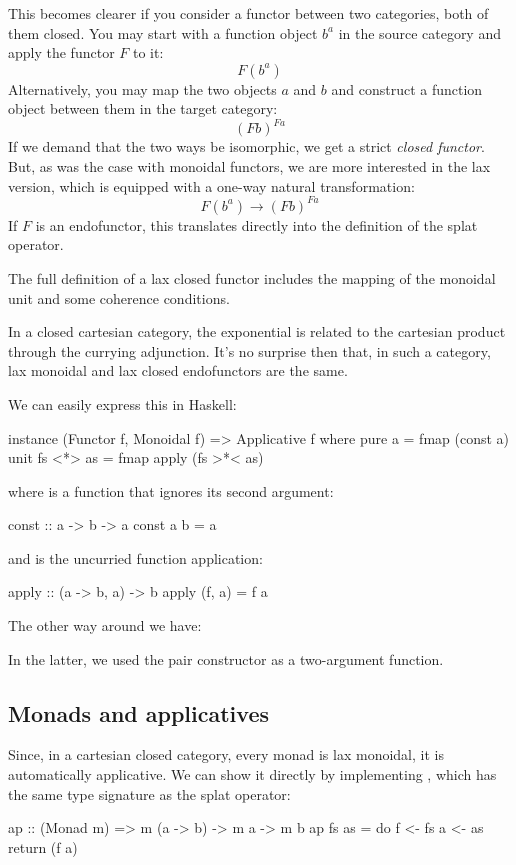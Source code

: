\documentclass[DaoFP]{subfiles}
\begin{document}
This becomes clearer if you consider a functor between two categories, both of them closed. You may start with a function object $b^a$ in the source category and apply the functor $F$ to it:
\[ F (b^a) \]
Alternatively, you may map the two objects $a$ and $b$ and construct a function object between them in the target category:
\[ (F b)^{F a} \]
If we demand that the two ways be isomorphic, we get a strict \emph{closed functor}. But, as was the case with monoidal functors, we are more interested in the lax version, which is equipped with a one-way natural transformation:
\[ F (b^a) \to (F b)^{F a} \]
If $F$ is an endofunctor, this translates directly into the definition of the splat operator. 

The full definition of a lax closed functor includes the mapping of the monoidal unit and some coherence conditions. 

In a closed cartesian category, the exponential is related to the cartesian product through the currying adjunction. It's no surprise then that, in such a category, lax monoidal and lax closed endofunctors are the same. 

We can easily express this in Haskell:
\begin{haskell}
instance (Functor f, Monoidal f) => Applicative f where
  pure a = fmap (const a) unit
  fs <*> as = fmap apply (fs >*< as)
\end{haskell}
where  is a function that ignores its second argument:
\begin{haskell}
const :: a -> b -> a
const a b = a
\end{haskell}
and  is the uncurried function application:
\begin{haskell}
apply :: (a -> b, a) -> b
apply (f, a) = f a
\end{haskell}
The other way around we have:
In the latter, we used the pair constructor \hask{(,)} as a two-argument function.

\subsection{Monads and applicatives}

Since, in a cartesian closed category, every monad is lax monoidal, it is automatically applicative. We can show it directly by implementing , which has the same type signature as the splat operator:
\begin{haskell}
ap :: (Monad m) => m (a -> b) -> m a -> m b
ap fs as = do 
    f <- fs
    a <- as
    return (f a) 
\end{haskell}
\end{document}
